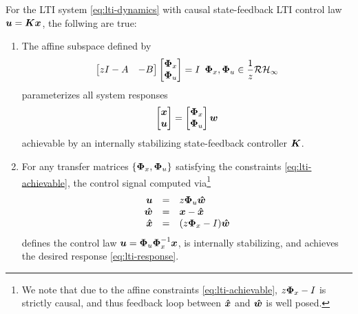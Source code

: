 \begin{theorem}\label{thm:lti-sls}
For the LTI system \eqref{eq:lti-dynamics} with causal state-feedback LTI control law $\boldsymbol{u} = \boldsymbol{K} \boldsymbol{x}$, the follwing are true:
\begin{enumerate}
\item The affine subspace defined by 
\begin{equation}
\begin{bmatrix} zI - A & - B \end{bmatrix} \begin{bmatrix} \boldsymbol{\Phi}_x \\ \boldsymbol{\Phi}_u \end{bmatrix} = I \, \ \boldsymbol{\Phi}_x, \boldsymbol{\Phi}_u \in \frac{1}{z}\mathcal{RH}_\infty
\label{eq:lti-achievable}
\end{equation}
parameterizes all system responses
\begin{equation}
\begin{bmatrix} \boldsymbol{x} \\ \boldsymbol{u} \end{bmatrix} = \begin{bmatrix} \boldsymbol{\Phi}_x \\ \boldsymbol{\Phi}_u \end{bmatrix} \boldsymbol{w}
\label{eq:lti-response}
\end{equation}
achievable by an internally stabilizing state-feedback controller $\boldsymbol{K}$.
\item For any transfer matrices $\left\{\boldsymbol{\Phi}_x, \boldsymbol{\Phi}_u\right\}$ satisfying the constraints \eqref{eq:lti-achievable}, the control signal computed via\footnote{We note that due to the affine constraints \eqref{eq:lti-achievable}, $z\boldsymbol{\Phi}_x-I$ is strictly causal, and thus feedback loop between $\boldsymbol{\hat x}$ and $\boldsymbol{\hat w}$ is well posed.}
\begin{equation}
\begin{array}{rcl}
\boldsymbol{u} &=& z\boldsymbol{\Phi}_u \boldsymbol{\hat w} \\
\boldsymbol{\hat w} &=& \boldsymbol{x} - \boldsymbol{\hat x} \\ 
\boldsymbol{\hat x} &=& (z\boldsymbol{\Phi}_x - I)\boldsymbol{\hat w}
\end{array}
\label{eq:lti-realization}
\end{equation}
defines the control law $\boldsymbol{u} = \boldsymbol{\Phi}_u\boldsymbol{\Phi}_x^{-1}\boldsymbol{x}$, is internally stabilizing, and achieves the desired response \eqref{eq:lti-response}.
\end{enumerate}
\end{theorem}

